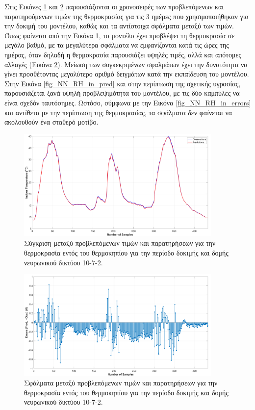 \documentclass[12pt, a4paper]{report} %
\begin{document}
Στις Εικόνες \ref{fig_NN_T_in_pred} και \ref{fig_NN_T_in_errors} παρουσιάζονται οι χρονοσειρές των προβλεπόμενων και 
παρατηρούμενων τιμών της θερμοκρασίας για τις 3 ημέρες που χρησιμοποιήθηκαν για την δοκιμή του μοντέλου, καθώς και τα 
αντίστοιχα σφάλματα μεταξύ των τιμών. Όπως φαίνεται από την Εικόνα \ref{fig_NN_T_in_pred}, το μοντέλο έχει προβλέψει τη 
θερμοκρασία σε μεγάλο βαθμό, με τα μεγαλύτερα σφάλματα να εμφανίζονται κατά τις ώρες της ημέρας, όταν δηλαδή η 
θερμοκρασία παρουσιάζει υψηλές τιμές, αλλά και απότομες αλλαγές (Εικόνα \ref{fig_NN_T_in_errors}). Μείωση των 
συγκεκριμένων σφαλμάτων έχει την δυνατότητα να γίνει προσθέτοντας μεγαλύτερο αριθμό δειγμάτων κατά την εκπαίδευση του 
μοντέλου. Στην Εικόνα \ref{fig_NN_RH_in_pred} και στην περίπτωση της σχετικής υγρασίας, παρουσιάζεται ξανά υψηλή 
προβλεψιμότητα του μοντέλου, με τις δύο καμπύλες να είναι σχεδόν ταυτόσημες. Ωστόσο, σύμφωνα με την Εικόνα 
\ref{fig_NN_RH_in_errors} και αντίθετα με την περίπτωση της θερμοκρασίας, τα σφάλματα δεν φαίνεται να ακολουθούν ένα 
σταθερό μοτίβο.

\begin{figure}[ht]%
    \centering
    \includegraphics[width=0.9\textwidth]{Figures/NN_T_in_pred.png}
    \caption{Σύγκριση μεταξύ προβλεπόμενων τιμών και παρατηρήσεων για την θερμοκρασία εντός του θερμοκηπίου για την 
    περίοδο δοκιμής και δομής νευρωνικού δικτύου 10-7-2.}
    \label{fig_NN_T_in_pred}
\end{figure}

\begin{figure}[ht]%
    \centering
    \includegraphics[width=0.9\textwidth]{Figures/NN_T_in_errors.png}
    \caption{Σφάλματα μεταξύ προβλεπόμενων τιμών και παρατηρήσεων για την θερμοκρασία εντός του θερμοκηπίου για την 
    περίοδο δοκιμής και δομής νευρωνικού δικτύου 10-7-2.}
    \label{fig_NN_T_in_errors}
\end{figure}
\end{document}
